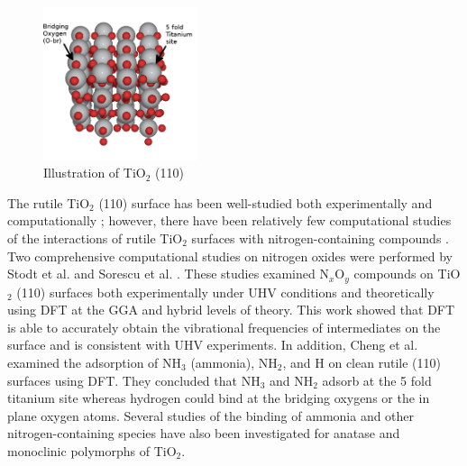 \documentclass[journal=ascecg,manuscript=article,articletitle=true]{achemso}
\begin{document}
\begin{figure}[h]
\centering
\includegraphics[width=0.4\textwidth]{figures/slab_angle.png}
\caption{Illustration of TiO$_2$ (110)}
\label{fig:model_surface}
\end{figure}
The rutile TiO$_2$ (110) surface has been well-studied both experimentally \cite{Benkoula2015,Walle2009,Lu1994,Rusu2000,Rusu2001,Henderson_2011} and computationally \cite{Stodt2013,Sorescu2000,Cheng2011,Diebold_2003}; however, there have been relatively few computational studies of the interactions of rutile TiO$_2$ surfaces with nitrogen-containing compounds \cite{Stodt2013,Sorescu2000,Cheng2011}. Two comprehensive computational studies on nitrogen oxides were performed by Stodt et al. \cite{Stodt2013} and Sorescu et al. \cite{Sorescu2000}.  These studies examined N$_x$O$_y$ compounds on TiO$_2$ (110) surfaces both experimentally under UHV conditions and theoretically using DFT at the GGA\cite{Sorescu2000} and hybrid \cite{Stodt2013} levels of theory. This work showed that DFT is able to accurately obtain the vibrational frequencies of intermediates on the surface and is consistent with UHV experiments.
In addition, Cheng et al. \cite{Cheng2011} examined the adsorption of NH$_3$ (ammonia), NH$_2$, and H on clean rutile (110) surfaces using DFT. They concluded that NH$_3$ and NH$_2$ adsorb at the 5 fold titanium site whereas hydrogen could bind at the bridging oxygens or the in plane oxygen atoms. Several studies of the binding of ammonia and other nitrogen-containing species have also been investigated for anatase \cite{Onal_2006,Erdogan_2010,Erdogan_2011,Markovits_1996,Ji_2014} and monoclinic \cite{Guo_2012} polymorphs of TiO$_2$.
\end{document}
